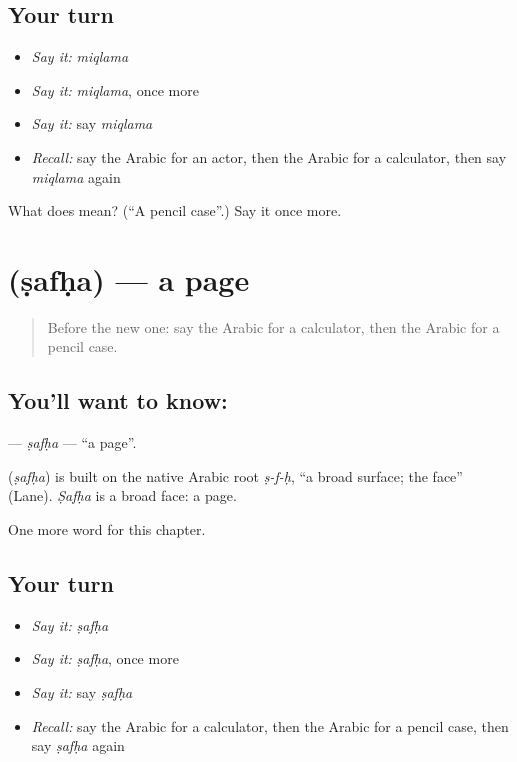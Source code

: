 \subsection*{Your turn}
\begin{itemize}
\raggedright
  \item \emph{Say it:} \emph{miqlama}
  \item \emph{Say it:} \emph{miqlama}, once more
  \item \emph{Say it:} say \emph{miqlama}
  \item \emph{Recall:} say the Arabic for an actor, then the Arabic for a calculator, then say \emph{miqlama} again
\end{itemize}

\begin{tcolorbox}[breakable,colback=teal!4,colframe=teal!35!black,title={Before you move on}]
What does  mean? (\textquotedblleft{}A pencil case\textquotedblright{}.) Say it once more.
\end{tcolorbox}
\section[\texorpdfstring{\ar{صفحة} (ṣafḥa)}{صفحة (ṣafḥa)}]{ (ṣafḥa) — a page}

\label{lesson:AR-C282-safha}



\begin{quote}
Before the new one: say the Arabic for a calculator, then the Arabic for a pencil case.
\end{quote}

\subsection*{You'll want to know: }
\textbf{} — \emph{ṣafḥa} — \textquotedblleft{}a page\textquotedblright{}.

\begin{cousinweb}
\textbf{} (\emph{ṣafḥa}) is built on the native Arabic root \emph{ṣ-f-ḥ}, \textquotedblleft{}a broad surface; the face\textquotedblright{} (Lane). \emph{Ṣafḥa} is a broad face: a page.
\end{cousinweb}

\begin{grammarlens}[title={What you've built}]
One more word for this chapter.
\end{grammarlens}

\subsection*{Your turn}
\begin{itemize}
\raggedright
  \item \emph{Say it:} \emph{ṣafḥa}
  \item \emph{Say it:} \emph{ṣafḥa}, once more
  \item \emph{Say it:} say \emph{ṣafḥa}
  \item \emph{Recall:} say the Arabic for a calculator, then the Arabic for a pencil case, then say \emph{ṣafḥa} again
\end{itemize}

